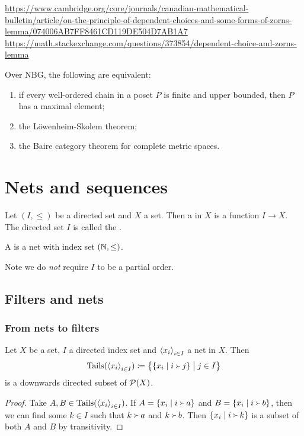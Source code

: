 \url{https://www.cambridge.org/core/journals/canadian-mathematical-bulletin/article/on-the-principle-of-dependent-choices-and-some-forms-of-zorns-lemma/074006AB7FF8461CD119DE504D7AB1A7}
\url{https://math.stackexchange.com/questions/373854/dependent-choice-and-zorns-lemma}

\begin{proposition}
Over NBG, the following are equivalent:
\begin{enumerate}
\item if every well-ordered chain in a poset $P$ is finite and upper bounded, then $P$ has a maximal element;
\item the Löwenheim-Skolem theorem;
\item the Baire category theorem for complete metric spaces.
\end{enumerate}
\end{proposition}


\section{Nets and sequences}
\begin{definition}
Let $(I,\leq)$ be a directed set and $X$ a set. Then a  in $X$ is a function $I\to X$. The directed set $I$ is called the .

A  is a net with index set $\sSet{\N, \leq}$.
\end{definition}
Note we do \emph{not} require $I$ to be a partial order.

\subsection{Filters and nets}
\subsubsection{From nets to filters}
\begin{lemma} \label{tailsDownwardsDirected}
Let $X$ be a set, $I$ a directed index set and $\left\langle x_i \right\rangle_{i\in I}$ a net in $X$. Then
\[ \Tails(\seq{x_i}_{i\in I}) \defeq \setbuilder[\big]{\setbuilder{x_i}{i \Yright j}}{j\in I} \]
is a downwards directed subset of $\operatorname{\mathcal{P}}(X)$.
\end{lemma}
\begin{proof}
Take $A,B\in \operatorname{Tails}(\left\langle x_i \right\rangle_{i\in I})$. If $A = \setbuilder{x_i}{i \Yright a}$ and $B = \setbuilder{x_i}{i \Yright b}$, then we can find some $k\in I$ such that $k \Yright a$ and $k\Yright b$. Then $\setbuilder{x_i}{i \Yright k}$ is a subset of both $A$ and $B$ by transitivity.
\end{proof}

